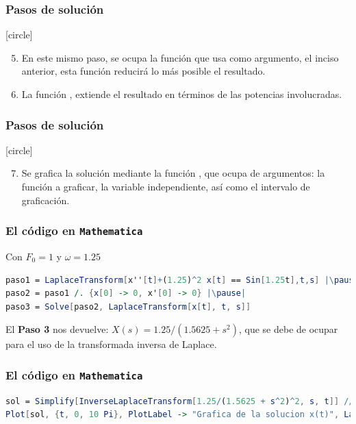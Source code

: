 \begin{frame}
\frametitle{Pasos de solución}
[circle]
\begin{enumerate}[<+->]
\setcounter{enumi}{4}
\item En este mismo paso, se ocupa la función  que usa como argumento, el inciso anterior, esta función reducirá lo más posible el resultado.
\item La función , extiende el resultado en términos de las potencias involucradas.
\end{enumerate}
\end{frame}
\begin{frame}
\frametitle{Pasos de solución}
[circle]
\begin{enumerate}[<+->]
\setcounter{enumi}{6}
\item Se grafica la solución mediante la función , que ocupa de argumentos: la función a graficar, la variable independiente, así como el intervalo de graficación. 
\end{enumerate}
\end{frame}
\begin{frame}[fragile]
\frametitle{El código en \texttt{Mathematica}}
Con $F_{0} = 1$ y $\omega = 1.25$
\\
\bigskip
\begin{lstlisting}[language=Mathematica]
paso1 = LaplaceTransform[x''[t]+(1.25)^2 x[t] == Sin[1.25t],t,s] |\pause|
paso2 = paso1 /. {x[0] -> 0, x'[0] -> 0} |\pause|
paso3 = Solve[paso2, LaplaceTransform[x[t], t, s]]
\end{lstlisting}
\pause
El \textbf{Paso 3} nos devuelve: $X(s) = 1.25/(1.5625 + s^{2})$, que se debe de ocupar para el uso de la transformada inversa de Laplace.
\end{frame}
\begin{frame}[fragile]
\frametitle{El código en \texttt{Mathematica}}
\begin{lstlisting}[language=Mathematica]
sol = Simplify[InverseLaplaceTransform[1.25/(1.5625 + s^2)^2, s, t]] // Expand |\pause|
Plot[sol, {t, 0, 10 Pi}, PlotLabel -> "Grafica de la solucion x(t)", LabelStyle -> Directive[FontSize -> 12], PlotStyle -> {Red}]
\end{lstlisting}
\end{frame}
